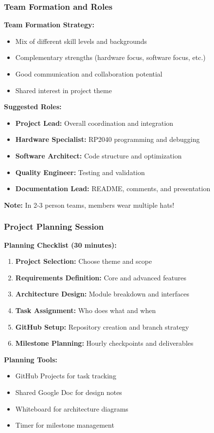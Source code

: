 \documentclass{beamer}
\begin{document}
\begin{frame}
\frametitle{Team Formation and Roles}
\textbf{Team Formation Strategy:}
\begin{itemize}
    \item Mix of different skill levels and backgrounds
    \item Complementary strengths (hardware focus, software focus, etc.)
    \item Good communication and collaboration potential
    \item Shared interest in project theme
\end{itemize}

\vspace{0.5cm}
\textbf{Suggested Roles:}
\begin{itemize}
    \item \textbf{Project Lead:} Overall coordination and integration
    \item \textbf{Hardware Specialist:} RP2040 programming and debugging
    \item \textbf{Software Architect:} Code structure and optimization
    \item \textbf{Quality Engineer:} Testing and validation
    \item \textbf{Documentation Lead:} README, comments, and presentation
\end{itemize}

\vspace{0.5cm}
\textbf{Note:} In 2-3 person teams, members wear multiple hats!
\end{frame}

\begin{frame}
\frametitle{Project Planning Session}
\textbf{Planning Checklist (30 minutes):}

\begin{enumerate}
    \item \textbf{Project Selection:} Choose theme and scope
    \item \textbf{Requirements Definition:} Core and advanced features
    \item \textbf{Architecture Design:} Module breakdown and interfaces
    \item \textbf{Task Assignment:} Who does what and when
    \item \textbf{GitHub Setup:} Repository creation and branch strategy
    \item \textbf{Milestone Planning:} Hourly checkpoints and deliverables
\end{enumerate}

\vspace{0.5cm}
\textbf{Planning Tools:}
\begin{itemize}
    \item GitHub Projects for task tracking
    \item Shared Google Doc for design notes
    \item Whiteboard for architecture diagrams
    \item Timer for milestone management
\end{itemize}
\end{frame}
\end{document}
